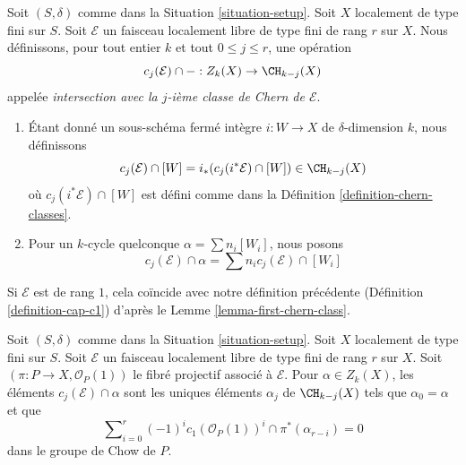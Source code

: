 \begin{definition}
\label{definition-cap-chern-classes}
Soit $(S, \delta)$ comme dans la Situation \ref{situation-setup}.
Soit $X$ localement de type fini sur $S$.
Soit $\mathcal{E}$ un faisceau localement libre de type fini de rang $r$ sur $X$.
Nous définissons, pour tout entier $k$ et tout $0 \leq j \leq r$,
une opération
$$
c_j(\mathcal{E}) \cap - : Z_k(X) \to \CH_{k - j}(X)
$$
appelée {\it intersection avec la $j$-ième classe de Chern de $\mathcal{E}$}.
\begin{enumerate}
\item Étant donné un sous-schéma fermé intègre $i : W \to X$ de $\delta$-dimension
$k$, nous définissons
$$
c_j(\mathcal{E}) \cap [W] = i_*(c_j({i^*\mathcal{E}}) \cap [W])
\in
\CH_{k - j}(X)
$$
où $c_j({i^*\mathcal{E}}) \cap [W]$ est défini comme dans la
Définition \ref{definition-chern-classes}.
\item Pour un $k$-cycle quelconque $\alpha = \sum n_i [W_i]$, nous posons
$$
c_j(\mathcal{E}) \cap \alpha = \sum n_i c_j(\mathcal{E}) \cap [W_i]
$$
\end{enumerate}
\end{definition}

\noindent
Si $\mathcal{E}$ est de rang $1$, cela coïncide avec notre
définition précédente (Définition \ref{definition-cap-c1})
d'après le Lemme \ref{lemma-first-chern-class}.

\begin{lemma}
\label{lemma-determine-intersections}
Soit $(S, \delta)$ comme dans la Situation \ref{situation-setup}.
Soit $X$ localement de type fini sur $S$.
Soit $\mathcal{E}$ un faisceau localement libre de type fini de rang $r$ sur $X$.
Soit $(\pi : P \to X, \mathcal{O}_P(1))$ le fibré projectif
associé à $\mathcal{E}$.
Pour $\alpha \in Z_k(X)$, les éléments
$c_j(\mathcal{E}) \cap \alpha$ sont les uniques éléments
$\alpha_j$ de $\CH_{k - j}(X)$
tels que $\alpha_0 = \alpha$ et que
$$
\sum\nolimits_{i = 0}^r
(-1)^i c_1(\mathcal{O}_P(1))^i \cap
\pi^*(\alpha_{r - i}) = 0
$$
dans le groupe de Chow de $P$.
\end{lemma}

